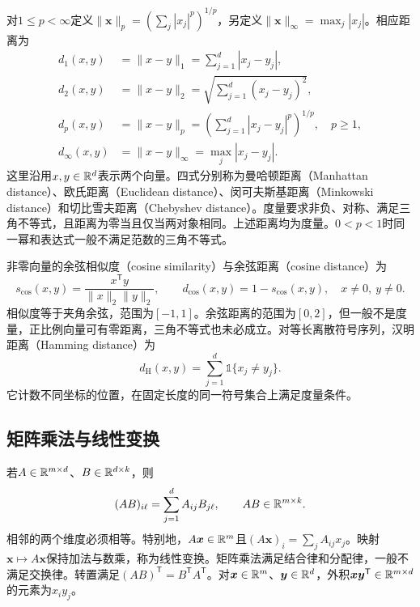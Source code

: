 对$1\leq p<\infty$定义$\|\bm x\|_p=(\sum_j|x_j|^p)^{1/p}$，另定义$\|\bm x\|_\infty=\max_j|x_j|$。相应距离为
\begin{align}
 d_1(x,y)&=\|x-y\|_1=\sum_{j=1}^d|x_j-y_j|,\label{eq:math-manhattan-distance}\\
 d_2(x,y)&=\|x-y\|_2=\sqrt{\sum_{j=1}^d(x_j-y_j)^2},\label{eq:math-euclidean-distance}\\
 d_p(x,y)&=\|x-y\|_p=\left(\sum_{j=1}^d|x_j-y_j|^p\right)^{1/p},\quad p\geq1,\label{eq:math-minkowski-distance}\\
 d_\infty(x,y)&=\|x-y\|_\infty=\max_j|x_j-y_j|.\label{eq:math-chebyshev-distance}
\end{align}
这里沿用$x,y\in\mathbb{R}^d$表示两个向量。四式分别称为曼哈顿距离（Manhattan distance）、欧氏距离（Euclidean distance）、闵可夫斯基距离（Minkowski distance）和切比雪夫距离（Chebyshev distance）。度量要求非负、对称、满足三角不等式，且距离为零当且仅当两对象相同。上述距离均为度量。$0<p<1$时同一幂和表达式一般不满足范数的三角不等式。

非零向量的余弦相似度（cosine similarity）与余弦距离（cosine distance）为
\begin{equation}
 s_{\cos}(x,y)=\frac{x^{\mathsf T}y}{\|x\|_2\|y\|_2},\qquad
 d_{\cos}(x,y)=1-s_{\cos}(x,y),\quad x\ne0,\ y\ne0.
 \label{eq:math-cosine-distance}
\end{equation}
相似度等于夹角余弦，范围为$[-1,1]$。余弦距离的范围为$[0,2]$，但一般不是度量，正比例向量可有零距离，三角不等式也未必成立。对等长离散符号序列，汉明距离（Hamming distance）为
\begin{equation}
 d_{\mathrm H}(x,y)=\sum_{j=1}^d\mathbb{1}\{x_j\ne y_j\}.
 \label{eq:math-hamming-distance}
\end{equation}
它计数不同坐标的位置，在固定长度的同一符号集合上满足度量条件。

\subsection{矩阵乘法与线性变换}
若$A\in\mathbb{R}^{m\times d}$、$B\in\mathbb{R}^{d\times k}$，则
\begin{equation}
 (AB)_{i\ell}=\sum_{j=1}^d A_{ij}B_{j\ell},\qquad AB\in\mathbb{R}^{m\times k}.
\end{equation}
相邻的两个维度必须相等。特别地，$A\bm x\in\mathbb{R}^m$且$(A\bm x)_i=\sum_jA_{ij}x_j$。映射$\bm x\mapsto A\bm x$保持加法与数乘，称为线性变换。矩阵乘法满足结合律和分配律，一般不满足交换律。转置满足$(AB)^{\mathsf T}=B^{\mathsf T}A^{\mathsf T}$。对$\bm x\in\mathbb{R}^m$、$\bm y\in\mathbb{R}^d$，外积$\bm x\bm y^{\mathsf T}\in\mathbb{R}^{m\times d}$的元素为$x_iy_j$。

